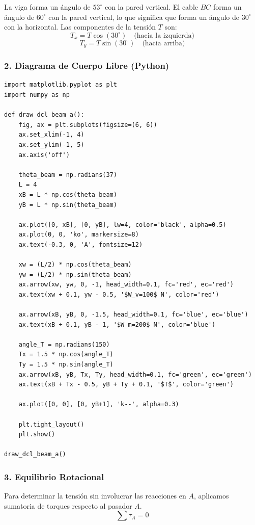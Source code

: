 \documentclass[12pt, a4paper]{article}
\begin{document}
La viga forma un ángulo de $53^\circ$ con la pared vertical. 
El cable $BC$ forma un ángulo de $60^\circ$ con la pared vertical, lo que significa que forma un ángulo de $30^\circ$ con la horizontal. Las componentes de la tensión $T$ son:
$$T_x = T \cos(30^\circ) \quad \text{(hacia la izquierda)}$$
$$T_y = T \sin(30^\circ) \quad \text{(hacia arriba)}$$

\subsubsection*{2. Diagrama de Cuerpo Libre (Python)}

\begin{lstlisting}
import matplotlib.pyplot as plt
import numpy as np

def draw_dcl_beam_a():
    fig, ax = plt.subplots(figsize=(6, 6))
    ax.set_xlim(-1, 4)
    ax.set_ylim(-1, 5)
    ax.axis('off')
    
    theta_beam = np.radians(37)
    L = 4
    xB = L * np.cos(theta_beam)
    yB = L * np.sin(theta_beam)
    
    ax.plot([0, xB], [0, yB], lw=4, color='black', alpha=0.5)
    ax.plot(0, 0, 'ko', markersize=8)
    ax.text(-0.3, 0, 'A', fontsize=12)
    
    xw = (L/2) * np.cos(theta_beam)
    yw = (L/2) * np.sin(theta_beam)
    ax.arrow(xw, yw, 0, -1, head_width=0.1, fc='red', ec='red')
    ax.text(xw + 0.1, yw - 0.5, '$W_v=100$ N', color='red')
    
    ax.arrow(xB, yB, 0, -1.5, head_width=0.1, fc='blue', ec='blue')
    ax.text(xB + 0.1, yB - 1, '$W_m=200$ N', color='blue')
    
    angle_T = np.radians(150)
    Tx = 1.5 * np.cos(angle_T)
    Ty = 1.5 * np.sin(angle_T)
    ax.arrow(xB, yB, Tx, Ty, head_width=0.1, fc='green', ec='green')
    ax.text(xB + Tx - 0.5, yB + Ty + 0.1, '$T$', color='green')
    
    ax.plot([0, 0], [0, yB+1], 'k--', alpha=0.3)

    plt.tight_layout()
    plt.show()

draw_dcl_beam_a()
\end{lstlisting}

\subsubsection*{3. Equilibrio Rotacional}
Para determinar la tensión sin involucrar las reacciones en $A$, aplicamos sumatoria de torques respecto al pasador $A$.
$$\sum \tau_A = 0$$
\end{document}

